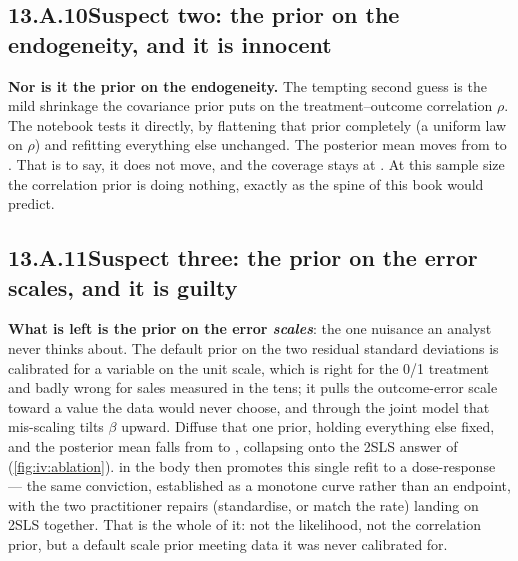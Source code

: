 \subsection*{13.A.10\quad Suspect two: the prior on the endogeneity, and it is innocent}

\textbf{Nor is it the prior on the endogeneity.} The tempting second guess is the mild shrinkage the
covariance prior puts on the treatment--outcome correlation $\rho$. The notebook tests it directly,
by flattening that prior completely (a uniform law on $\rho$) and refitting everything else
unchanged. The posterior mean moves from \eur{\nbElevenGaussMean} to \eur{\nbElevenGaussFlatMean}.
That is to say, it does not move, and the coverage stays at \pc{\nbElevenGaussFlatCov}. At this
sample size the correlation prior is doing nothing, exactly as the spine of this book would predict.

\subsection*{13.A.11\quad Suspect three: the prior on the error scales, and it is guilty}

\textbf{What is left is the prior on the error \emph{scales}}: the one nuisance an analyst never
thinks about. The default prior on the two residual standard deviations is calibrated for a variable
on the unit scale, which is right for the 0/1 treatment and badly wrong for sales measured in the
tens; it pulls the outcome-error scale toward a value the data would never choose, and through the
joint model that mis-scaling tilts $\beta$ upward. Diffuse that one prior, holding everything else
fixed, and the posterior mean falls from \eur{\nbElevenGaussMean} to
\eur{\nbElevenGaussScalediffuseMean}, collapsing onto the 2SLS answer of \eur{\nbElevenIvEst}
(\cref{fig:iv:ablation}).  in the body then promotes this single refit to a
dose-response --- the same conviction, established as a monotone curve rather than an endpoint,
with the two practitioner repairs (standardise, or match the rate) landing on 2SLS together.
That is the whole of it: not the likelihood, not the correlation prior, but a default scale
prior meeting data it was never calibrated for.

